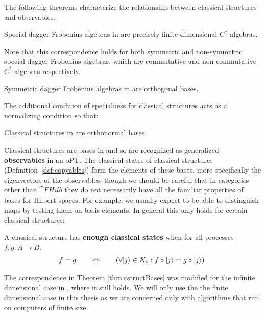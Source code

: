 The following theorems characterize the relationship between classical structures and observables. 

\begin{theorem}
Special dagger Frobenius algebras in  are precisely finite-dimensional C$^*$-algebras.
\end{theorem}
\noindent Note that this correspondence holds for both symmetric and non-symmetric special dagger Frobenius algebras, which are commutative and non-commutative $C^*$ algebras respectively.

\begin{theorem}
Symmetric dagger Frobenius algebras in  are orthogonal bases.
\end{theorem}
\noindent The additional condition of specialness for classical structures acts as a normalizing condition so that:
\begin{theorem}
\label{thm:cstructBases}
Classical structures in  are orthonormal bases.
\end{theorem}

\noindent \noindent Classical structures are bases in  and so are recognized as generalized \textbf{observables} in an oPT. The classical states of classical structures  (Definition~\ref{def:copyables}) form the elements of these bases, more specifically the eigenvectors of the observables, though we should be careful that in categories other than $\cat{FHilb}$ they do not necessarily have all the familiar properties of bases for Hilbert spaces.  For example, we usually expect to be able to distinguish maps by testing them on basis elements. In general this only holds for certain classical structures:

\begin{defn}
\label{def:enoughclassicalpoints}
A classical structure has \textbf{enough classical states} when for all processes $f,g:A\to B$: 
\begin{align}
f=g \qquad \Leftrightarrow \qquad \left(\forall | j \rangle\in K_{\circ}:f\circ| j \rangle=g\circ| j \rangle\right)\; 
\end{align}
\end{defn}

\begin{remark}
The correspondence in Theorem \ref{thm:cstructBases} was modified for the infinite dimensional case in \cite{abramsky2012h}, where it still holds. We will only use the the finite dimensional case in this thesis as we are concerned only with algorithms that run on computers of finite size.
\end{remark}

